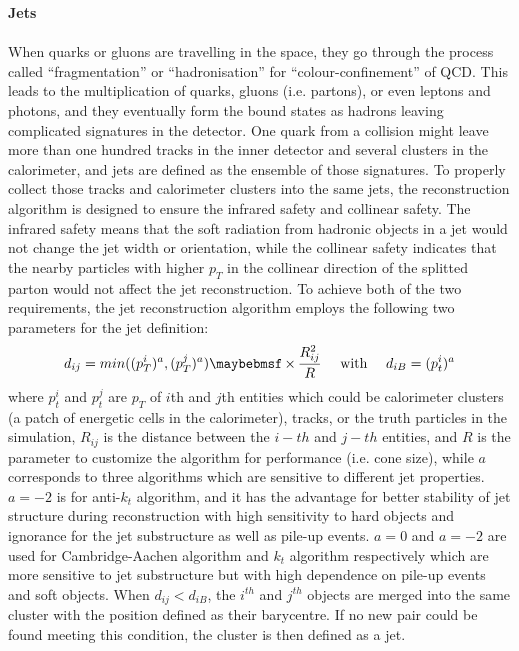 \newpage
\noindent
{\bf Jets}
\\
\\When quarks or gluons are travelling in the space, they go through the process called ``fragmentation'' or ``hadronisation'' for ``colour-confinement'' of QCD. This leads to the multiplication of quarks, gluons (i.e. partons), or even leptons and photons, and they eventually form the bound states as hadrons leaving complicated signatures in the detector. One quark from a collision might leave more than one hundred tracks in the inner detector and several clusters in the calorimeter, and jets are defined as the ensemble of those signatures. To properly collect those tracks and calorimeter clusters into the same jets, the reconstruction algorithm is designed to ensure the infrared safety and collinear safety. The infrared safety means that 
the soft radiation from hadronic objects in a jet would not change the jet width or orientation, while the collinear safety indicates that the nearby particles with higher $p_{T}$ in the collinear direction of the splitted parton would not affect the jet reconstruction. To achieve both of the two requirements, the jet reconstruction algorithm\cite{Atkin:2015msa} employs the following two parameters for the jet definition: 
\begin{equation}
d_{ij}=min((\pt^{i})^{a},(\pt^{j})^{a})\times \frac{R_{ij}^{2}}{R}
\quad \text{ with } \quad
d_{iB}=(p_{t}^{i})^{a}
\end{equation}
where $p_{t}^{i}$ and $p_{t}^{j}$ are $p_{T}$ of $i$th and $j$th entities which could be calorimeter clusters (a patch of energetic cells in the calorimeter), tracks, or the truth particles in the simulation, $R_{ij}$ is the distance between the $i-th$ and $j-th$ entities, and $R$ is the parameter to customize the algorithm for performance (i.e. cone size), while $a$ corresponds to three algorithms which are sensitive to different jet properties. $a=-2$ is for anti-$k_{t}$ algorithm, and it has the advantage for better stability of jet structure during reconstruction with high sensitivity to hard objects and ignorance for the jet substructure as well as pile-up events. $a=0$ and $a=-2$ are used for Cambridge-Aachen algorithm and $k_{t}$ algorithm respectively which are more sensitive to jet substructure but with high dependence on pile-up events and soft objects. When $d_{ij}<d_{iB}$, the $i^{th}$ and $j^{th}$ objects are merged into the same cluster with the position defined as their barycentre. If no new pair could be found meeting this condition, the cluster is then defined as a jet. 
